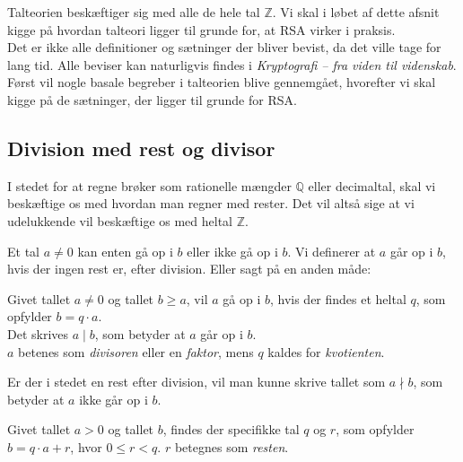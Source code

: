 

Talteorien beskæftiger sig med alle de hele tal \(\mathbb{Z}\).
Vi skal i løbet af dette afsnit kigge på hvordan talteori ligger til grunde for, at RSA virker i praksis.
\\
Det er ikke alle definitioner og sætninger der bliver bevist, da det ville tage for lang tid.
Alle beviser kan naturligvis findes i \textit{Kryptografi -- fra viden til videnskab}. \cite{krypto}\\

Først vil nogle basale begreber i talteorien blive gennemgået, hvorefter vi skal kigge på de sætninger, der ligger til grunde for RSA.

\subsection{Division med rest og divisor}
I stedet for at regne brøker som rationelle mængder \(\mathbb{Q}\) eller decimaltal, skal vi beskæftige os med hvordan man regner med rester.
Det vil altså sige at vi udelukkende vil beskæftige os med heltal \(\mathbb{Z}\).

Et tal \(a \neq 0\) kan enten gå op i \(b\) eller ikke gå op i \(b\).
Vi definerer at \(a\) går op i \(b\), hvis der ingen rest er, efter division. Eller sagt på en anden måde:


\begin{definition}
    \label{heldiv}
    Givet tallet \(a \neq 0\) og tallet \(b \geq a\), vil \(a\) gå op i \(b\),
    hvis der findes et heltal \(q\), som opfylder \(b = q \cdot a\).\\
    Det skrives \(a \mid b\), som betyder at \(a\) går op i \(b\).\\
    \(a\) betenes som \textit{divisoren} eller en \textit{faktor},
    mens \(q\) kaldes for \textit{kvotienten}.\cite[70]{krypto}
\end{definition}

Er der i stedet en rest efter division, vil man kunne skrive tallet som \(a \nmid b\), som betyder at \(a\) ikke går op i \(b\).

\begin{sent}
    \label{rest}
    Givet tallet \(a > 0\) og tallet \(b\), findes der specifikke tal \(q\) og \(r\), som opfylder \(b = q \cdot a + r\), hvor \(0 \leq r < q\). \(r\) betegnes som \textit{resten}.
\end{sent}



